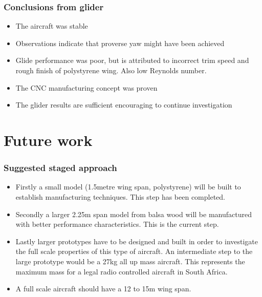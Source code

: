 \documentclass{beamer}
\begin{document}
\begin{frame}
\frametitle{Conclusions from glider}

\begin{itemize}
\item The aircraft was stable
\item Observations indicate that proverse yaw might have been achieved
\item Glide performance was poor, but is attributed to incorrect trim speed and rough finish of polystyrene wing.  Also low Reynolds number.
\item The CNC manufacturing concept was proven
\item The glider results are sufficient encouraging to continue investigation
\end{itemize}

\end{frame}





\section{Future work}


\begin{frame}
\frametitle{Suggested staged approach}

\begin{itemize}
\item Firstly a small model (1.5metre wing span, polystyrene) will be built to establish manufacturing techniques.  This step has been completed.
\item Secondly a larger 2.25m span model from balsa wood will be manufactured with better performance characteristics.  This is the current step.
\item Lastly larger prototypes have to be designed and built in order to investigate the full scale properties of this type of aircraft.  An intermediate step to the large prototype would be a 27kg all up mass aircraft.  This represents the maximum mass for a legal radio controlled aircraft in South Africa.
\item A full scale aircraft should have a 12 to 15m wing span.  
\end{itemize}

\end{frame}
\end{document}
